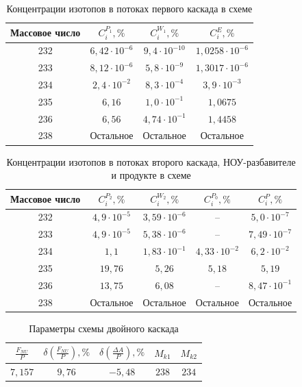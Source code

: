 \begin{table}
\begin{tabular}{|c|c|c|c|}
    \hline Массовое число & $C_{i}^{P_{1}}, \%$ & $C_{i}^{W_{1}}, \%$ & $C_{i}^{E}, \%$\\
    \hline 232 & $6,42\cdot10^{-6}$ & $9,4\cdot10^{-10}$ & $1,0258\cdot10^{-6}$\\
    233 & $8,12\cdot10^{-6}$ & $5,8\cdot10^{-9}$ & $1,3017\cdot10^{-6}$\\
    234 & $2,4\cdot10^{-2}$ & $8,3\cdot10^{-4}$ & $3,9\cdot10^{-3}$\\
    235 & $6,16$ & $1,0\cdot10^{-1}$ & $1,0675$\\
    236 & $6,56$ & $4,74\cdot10^{-1}$ & $1,4458$\\
    238 & Остальное & Остальное & Остальное\\
    \hline
\end{tabular}
\caption{Концентрации изотопов в потоках первого каскада в схеме}\label{MDKcas1params}
\end{table}

\begin{table}
    \begin{tabular}{|c|c|c|c|c|}
        \hline Массовое число & $C_{i}^{P_{2}}, \%$ & $C_{i}^{W_{2}}, \%$ & $C_{i}^{P_{0}}, \%$ & $C_{i}^{P}, \%$\\
        \hline 232 & $4,9\cdot10^{-5}$ & $3,59\cdot10^{-6}$ & -- & $5,0\cdot10^{-7}$\\
        233 & $4,9\cdot10^{-5}$ & $5,38\cdot10^{-6}$ & -- & $7,49\cdot10^{-7}$\\
        234 & $1,1$ & $1,83\cdot10^{-1}$ & $4,33\cdot10^{-2}$ & $6,2\cdot10^{-2}$\\
        235 & $19,76$ & $5,26$ & $5,18$  & $5,19$\\
        236 & $13,75$ & $6,08$ & --  & $8,47\cdot10^{-1}$\\
        238 & Остальное & Остальное & Остальное  & Остальное\\
        \hline
\end{tabular}
\caption{Концентрации изотопов в потоках второго каскада, НОУ-разбавителе и продукте в схеме}\label{MDKcas2params}
\end{table}


\begin{table}[h]
\centering
\normalsize\begin{tabulary}{1.0\textwidth}{|c|c||c||c|c|}
    \hline $\frac{F_{NU}}{P}$ & $\delta(\frac{F_{NU}}{P}), \%$ & $\delta(\frac{\Delta A}{P}), \%$ & $M_{k1}$ & $M_{k2}$ \\
    \hline $7,157$ & $9,76$ & $-5,48$ & $238$ & $234$ \\\hline
\end{tabulary}
\caption{Параметры схемы двойного каскада}\label{MDKparams}
\end{table}



